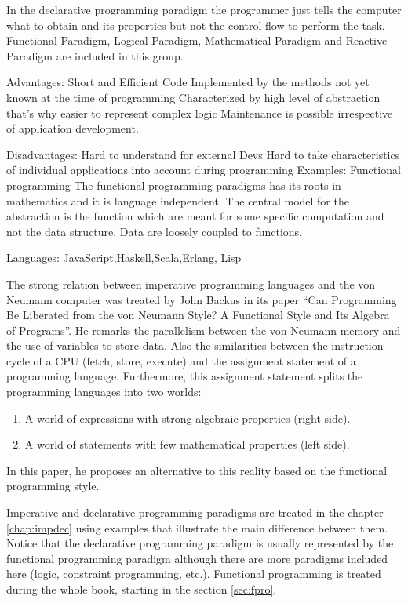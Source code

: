 In the declarative programming paradigm the programmer just tells the computer what to obtain and its properties but not the control flow to perform the task.
Functional Paradigm, Logical Paradigm, Mathematical Paradigm and Reactive Paradigm are included in this group.
 
Advantages:
Short and Efficient Code
Implemented by the methods not yet known at the time of programming
Characterized by high level of abstraction that's why easier to represent complex logic
Maintenance is possible irrespective of application development.

Disadvantages:
Hard to understand for external Devs
Hard to take characteristics of individual applications into account during programming
Examples:
Functional programming The functional programming paradigms has its roots in mathematics and it is language independent. The central model 
for the abstraction is the function which are meant for some specific computation and not the data structure. Data are loosely coupled to 
functions.

Languages: JavaScript,Haskell,Scala,Erlang, Lisp
 
 
 
 
 
 
 
The strong relation between imperative programming languages and the von Neumann computer was treated by John Backus in its paper ``Can 
Programming Be Liberated from the von Neumann Style? A Functional Style and Its Algebra of Programs''. 
He remarks the parallelism between the von Neumann memory and the use of variables to store data.
Also the similarities between the instruction cycle of a CPU (fetch, store, execute) and the assignment statement of a programming language. 
Furthermore, this assignment statement splits the programming languages into two worlds: 
\begin{enumerate}
    \item A world of expressions with strong algebraic properties (right side).
    \item A world of statements with few mathematical properties (left side).
\end{enumerate} 
In this paper, he proposes an alternative to this reality based on the functional programming style. 

Imperative and declarative programming paradigms are treated in the chapter \ref{chap:impdec} using examples that illustrate the main difference between them. 
Notice that the declarative programming paradigm is usually represented by the functional programming paradigm although there are more paradigms included here (logic, constraint programming, etc.).
Functional programming is treated during the whole book, starting in the section \ref{sec:fpro}.

